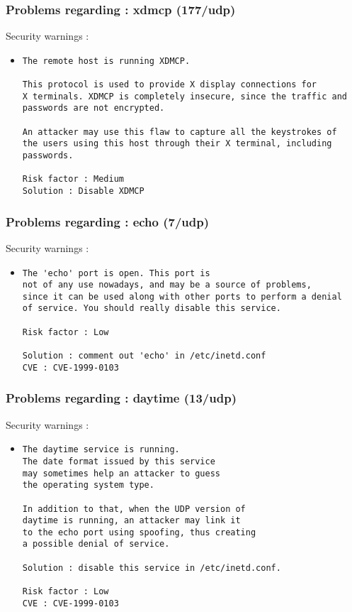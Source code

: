 \documentclass{article}
\begin{document}
\subsubsection{Problems regarding : xdmcp (177/udp)}
Security warnings :\\
\begin{itemize}
\item \begin{verbatim}
The remote host is running XDMCP.

This protocol is used to provide X display connections for 
X terminals. XDMCP is completely insecure, since the traffic and
passwords are not encrypted. 

An attacker may use this flaw to capture all the keystrokes of
the users using this host through their X terminal, including
passwords.

Risk factor : Medium
Solution : Disable XDMCP
\end{verbatim}\end{itemize}
\subsubsection{Problems regarding : echo (7/udp)}
Security warnings :\\
\begin{itemize}
\item \begin{verbatim}
The 'echo' port is open. This port is
not of any use nowadays, and may be a source of problems, 
since it can be used along with other ports to perform a denial
of service. You should really disable this service.

Risk factor : Low

Solution : comment out 'echo' in /etc/inetd.conf
CVE : CVE-1999-0103
\end{verbatim}\end{itemize}
\subsubsection{Problems regarding : daytime (13/udp)}
Security warnings :\\
\begin{itemize}
\item \begin{verbatim}
The daytime service is running.
The date format issued by this service
may sometimes help an attacker to guess
the operating system type. 

In addition to that, when the UDP version of
daytime is running, an attacker may link it 
to the echo port using spoofing, thus creating
a possible denial of service.

Solution : disable this service in /etc/inetd.conf.

Risk factor : Low
CVE : CVE-1999-0103
\end{verbatim}\end{itemize}
\newpage
\end{document}
